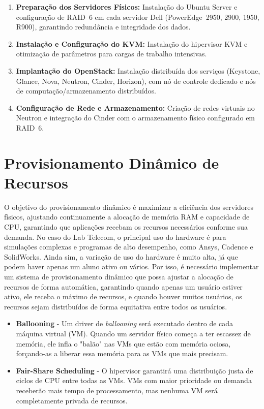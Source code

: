 \begin{enumerate}
 \item \textbf{Preparação dos Servidores Físicos:} Instalação do Ubuntu Server e configuração de RAID~6 em cada servidor Dell (PowerEdge~2950, 2900, 1950, R900), garantindo redundância e integridade dos dados.
 \item \textbf{Instalação e Configuração do KVM:} Instalação do hipervisor KVM e otimização de parâmetros para cargas de trabalho intensivas.
 \item \textbf{Implantação do OpenStack:} Instalação distribuída dos serviços (Keystone, Glance, Nova, Neutron, Cinder, Horizon), com nó de controle dedicado e nós de computação/armazenamento distribuídos.
 \item \textbf{Configuração de Rede e Armazenamento:} Criação de redes virtuais no Neutron e integração do Cinder com o armazenamento físico configurado em RAID~6.
\end{enumerate}


\section{Provisionamento Dinâmico de Recursos}

O objetivo do provisionamento dinâmico é maximizar a eficiência dos servidores físicos, ajustando continuamente a alocação de memória RAM e capacidade de CPU, garantindo que aplicações recebam os recursos necessários conforme sua demanda. No caso do Lab Telecom, o principal uso do hardware é para simulações complexas e programas de alto desempenho, como Ansys, Cadence e SolidWorks. Ainda sim, a variação de uso do hardware é muito alta, já que podem haver apenas um aluno ativo ou vários. Por isso, é necessário implementar um sistema de provisionamento dinâmico que possa ajustar a alocação de recursos de forma automática, garantindo quando apenas um usuário estiver ativo, ele receba o máximo de recursos, e quando houver muitos usuários, os recursos sejam distribuídos de forma equitativa entre todos os usuários.

\begin{itemize}
\item \textbf{Ballooning} - Um driver de \textit{ballooning} será executado dentro de cada máquina virtual (VM). Quando um servidor físico começa a ter escassez de memória, ele infla o "balão" nas VMs que estão com memória ociosa, forçando-as a liberar essa memória para as VMs que mais precisam.

\item \textbf{Fair-Share Scheduling} - O hipervisor garantirá uma distribuição justa de ciclos de CPU entre todas as VMs. VMs com maior prioridade ou demanda receberão mais tempo de processamento, mas nenhuma VM será completamente privada de recursos.
\end{itemize}


